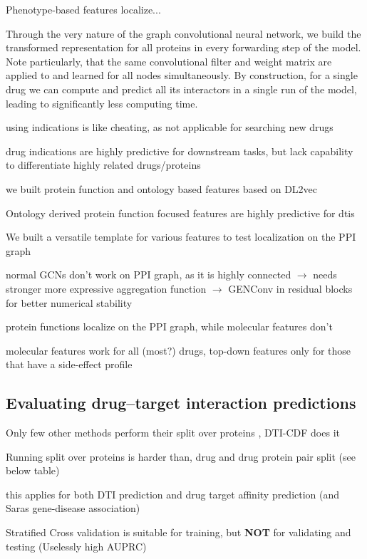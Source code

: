 \documentclass{bioinfo}
\begin{document}
Phenotype-based features localize...


Through the very nature of the graph convolutional neural network, we
build the transformed representation for all proteins in every
forwarding step of the model. Note particularly, that the same
convolutional filter and weight matrix are applied to and learned for
all nodes simultaneously. By construction, for a single drug we can
compute and predict all its interactors in a single run of the model,
leading to significantly less computing time.


using indications is like cheating, as not applicable for searching new drugs

drug indications are highly predictive for downstream tasks, but lack capability to differentiate highly related drugs/proteins

we built protein function and ontology based features based on DL2vec

Ontology derived protein function focused features are highly predictive for dtis

We built a versatile template for various features to test localization on the PPI graph

normal GCNs don't work on PPI graph, as it is highly connected $\rightarrow$ needs stronger more expressive aggregation function $\rightarrow$ GENConv in residual blocks for better numerical stability

protein functions localize on the PPI graph, while molecular features don't


molecular features work for all (most?) drugs, top-down features only
for those that have a side-effect profile


\subsection{Evaluating drug--target interaction predictions}

Only few other methods perform their split over proteins \citep{Survey2018}, DTI-CDF does it

Running split over proteins is harder than, drug and drug protein pair split (see below table)

this applies for both DTI prediction and drug target affinity prediction (and Saras gene-disease association)

Stratified Cross validation is suitable for training, but \textbf{NOT} for validating and testing (Uselessly high AUPRC)
\end{document}
